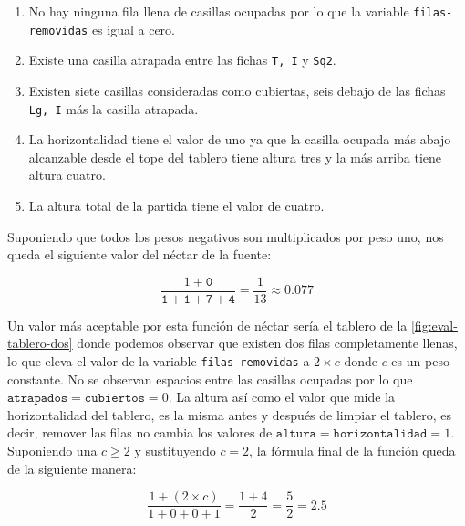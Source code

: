 \begin{enumerate}
\item No hay ninguna fila llena de casillas ocupadas por lo que la variable 
\texttt{filas-removidas} es igual a cero.

\item Existe una casilla atrapada entre las fichas \texttt{T, I} y \texttt{Sq2}.

\item Existen siete casillas consideradas como cubiertas, seis debajo de las fichas 
\texttt{Lg, I} más la casilla atrapada.

\item La horizontalidad tiene el valor de uno ya que la casilla ocupada más abajo 
alcanzable desde el tope del tablero tiene altura tres y la más arriba tiene 
altura cuatro. 

\item La altura total de la partida tiene el valor de cuatro.

\end{enumerate}

Suponiendo que todos los pesos negativos son multiplicados por peso uno, nos queda 
el siguiente valor del néctar de la fuente:

\begin{displaymath}
    \frac{1 + \texttt{0}}{\texttt{1} + \texttt{1} + \texttt{7} + \texttt{4}} = \frac{1}{13} \approx 0.077
\end{displaymath}



Un valor más aceptable por esta función de néctar sería el tablero de la 
\cref{fig:eval-tablero-dos} donde podemos observar que existen dos filas 
completamente llenas, lo que eleva el valor de la variable \texttt{filas-removidas} a 
$2 \times c$ donde $c$ es un peso constante. No se observan espacios entre las 
casillas ocupadas por lo que $\texttt{atrapados} = \texttt{cubiertos} = 0$. La 
altura así como el valor que mide la horizontalidad del tablero, es la misma antes 
y después de limpiar el tablero, es decir, remover las filas no cambia los valores de  
$\texttt{altura} = \texttt{horizontalidad} = 1$. Suponiendo una $c \geq 2$ y 
sustituyendo $c = 2$, la fórmula final de la función queda de la siguiente manera: 

\begin{displaymath}
    \frac{1 + (2 \times c)}{1 + 0 + 0 + 1} = \frac{1 + 4}{2} = \frac{5}{2} = 2.5
\end{displaymath}

